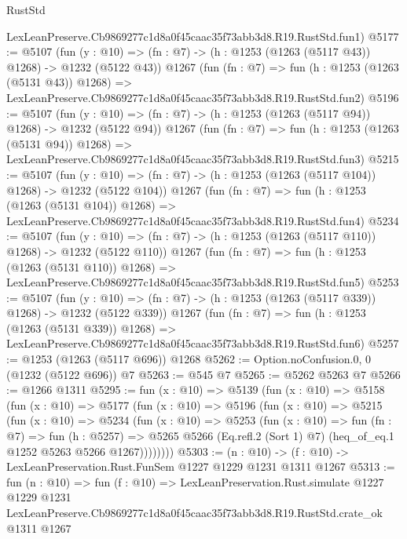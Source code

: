 \begin{lexlean}{RustStd}
\begin{coremodule}
    LexLeanPreserve.Cb9869277c1d8a0f45caac35f73abb3d8.R19.RustStd.fun1)
@5177 := @5107
    (fun (y : @10) => (fn : @7) -> (h : @1253 (@1263 (@5117 @43)) @1268) -> @1232 (@5122 @43))
    @1267
    (fun (fn : @7) =>
    fun (h : @1253 (@1263 (@5131 @43)) @1268) =>
    LexLeanPreserve.Cb9869277c1d8a0f45caac35f73abb3d8.R19.RustStd.fun2)
@5196 := @5107
    (fun (y : @10) => (fn : @7) -> (h : @1253 (@1263 (@5117 @94)) @1268) -> @1232 (@5122 @94))
    @1267
    (fun (fn : @7) =>
    fun (h : @1253 (@1263 (@5131 @94)) @1268) =>
    LexLeanPreserve.Cb9869277c1d8a0f45caac35f73abb3d8.R19.RustStd.fun3)
@5215 := @5107
    (fun (y : @10) => (fn : @7) -> (h : @1253 (@1263 (@5117 @104)) @1268) -> @1232 (@5122 @104))
    @1267
    (fun (fn : @7) =>
    fun (h : @1253 (@1263 (@5131 @104)) @1268) =>
    LexLeanPreserve.Cb9869277c1d8a0f45caac35f73abb3d8.R19.RustStd.fun4)
@5234 := @5107
    (fun (y : @10) => (fn : @7) -> (h : @1253 (@1263 (@5117 @110)) @1268) -> @1232 (@5122 @110))
    @1267
    (fun (fn : @7) =>
    fun (h : @1253 (@1263 (@5131 @110)) @1268) =>
    LexLeanPreserve.Cb9869277c1d8a0f45caac35f73abb3d8.R19.RustStd.fun5)
@5253 := @5107
    (fun (y : @10) => (fn : @7) -> (h : @1253 (@1263 (@5117 @339)) @1268) -> @1232 (@5122 @339))
    @1267
    (fun (fn : @7) =>
    fun (h : @1253 (@1263 (@5131 @339)) @1268) =>
    LexLeanPreserve.Cb9869277c1d8a0f45caac35f73abb3d8.R19.RustStd.fun6)
@5257 := @1253 (@1263 (@5117 @696)) @1268
@5262 := Option.noConfusion.{0, 0} (@1232 (@5122 @696)) @7
@5263 := @545 @7
@5265 := @5262 @5263 @7
@5266 := @1266 @1311
@5295 := fun (x : @10) =>
  @5139
    (fun (x : @10) =>
    @5158
      (fun (x : @10) =>
      @5177
        (fun (x : @10) =>
        @5196
          (fun (x : @10) =>
          @5215
            (fun (x : @10) =>
            @5234
              (fun (x : @10) =>
              @5253
                (fun (x : @10) =>
                fun (fn : @7) =>
                fun (h : @5257) =>
                @5265 @5266 (Eq.refl.{2} (Sort 1) @7) (heq_of_eq.{1} @1252 @5263 @5266 @1267))))))))
@5303 := (n : @10) -> (f : @10) -> LexLeanPreservation.Rust.FunSem @1227 @1229 @1231 @1311 @1267
@5313 := fun (n : @10) =>
  fun (f : @10) =>
  LexLeanPreservation.Rust.simulate
    @1227
    @1229
    @1231
    LexLeanPreserve.Cb9869277c1d8a0f45caac35f73abb3d8.R19.RustStd.crate_ok
    @1311
    @1267
\end{coremodule}
\end{lexlean}
